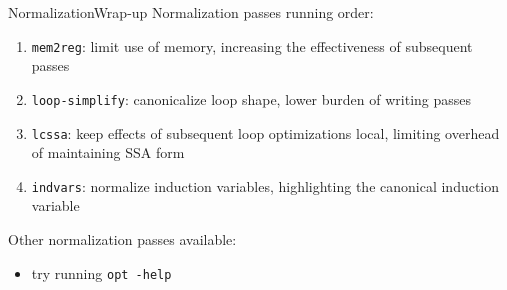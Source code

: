 \begin{frame}{Normalization}{Wrap-up}
Normalization passes running order:

\begin{enumerate}
\item \texttt{mem2reg}: limit use of memory, increasing the effectiveness of
       subsequent passes
\item \texttt{loop-simplify}: canonicalize loop shape, lower burden of writing
      passes
\item \texttt{lcssa}: keep effects of subsequent loop optimizations local,
      limiting overhead of maintaining SSA form
\item \texttt{indvars}: normalize induction variables, highlighting the
      canonical induction variable
\end{enumerate}

\vfill
Other normalization passes available:

\begin{itemize}
\item try running \texttt{opt -help}
\end{itemize}
\end{frame}


